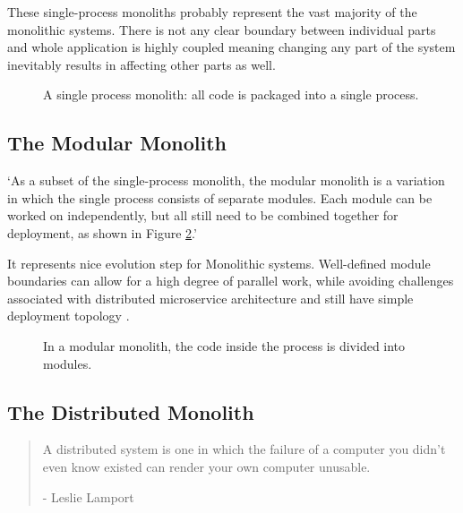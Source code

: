 These single-process monoliths probably represent the vast majority of the monolithic systems. There is not any clear boundary between individual parts and whole application is highly coupled \cite{EVOLUTIONARY_ARCHITERUES_COUPLING} meaning changing any part of the system inevitably results in affecting other parts as well.

\begin{figure}
    \centering
    
    \caption{A single process monolith: all code is packaged into a single process. \cite{MON_TO_MS_MONOLITH}\label{img:monolith_single_process}}
\end{figure}


\subsection{The Modular Monolith}
`As a subset of the single-process monolith, the modular monolith is a variation in which the single process consists of separate modules. Each module can be worked on independently, but all still need to be combined together for deployment, as shown in Figure \ref{img:monolith_single_process_modular}.' \cite{BUILDING_MS_MONOLITH}

It represents nice evolution step for Monolithic systems. Well-defined module boundaries can allow for a high degree of parallel work, while avoiding challenges associated with distributed microservice architecture and still have simple deployment topology \cite{BUILDING_MS_MONOLITH}.


\begin{figure}
    \centering
    
    \caption{In a modular monolith, the code inside the process is divided into modules. \cite{BUILDING_MS_MONOLITH}\label{img:monolith_single_process_modular}}
\end{figure}


\subsection{The Distributed Monolith}
\begin{quote}
    A distributed system is one in which the failure of a computer you didn’t even know existed can render your own computer unusable. \cite{lamport1987distribution}
    \begin{flushright}
        - Leslie Lamport
    \end{flushright}
\end{quote}

